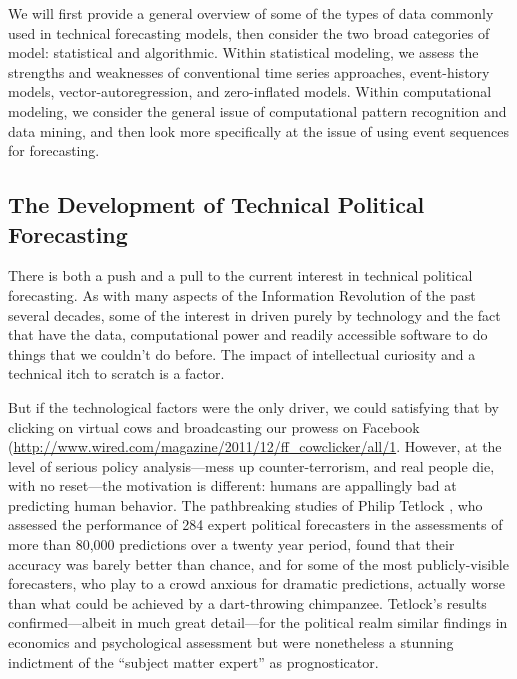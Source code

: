 \documentclass[graybox]{svmult}
\begin{document}
We will first provide a general overview of some of the types of data commonly used in technical forecasting models, then consider the two broad categories of model: statistical and algorithmic. {\color{blue}{[next sentences will be updated when manuscript is complete]}}Within statistical modeling, we assess the strengths and weaknesses of conventional time series approaches, event-history models, vector-autoregression, and zero-inflated models. Within computational modeling, we consider the general issue of computational pattern recognition and data mining, and then look more specifically at the issue of using event sequences for forecasting. 

\subsection{The Development of Technical Political Forecasting}
\label{subsec:TPF}

There is both a push and a pull to the current interest in technical political forecasting. As with many aspects of the Information Revolution of the past several decades, some of the interest in driven purely by technology and the fact that have the data, computational power and readily accessible software to do things that we couldn't do before. The impact of intellectual curiosity and a technical itch to scratch is a factor.

But if the technological factors were the only driver, we could satisfying that by clicking on virtual cows and broadcasting our prowess on Facebook (\url{http://www.wired.com/magazine/2011/12/ff\_cowclicker/all/1}. However, at the level of serious policy analysis---mess up counter-terrorism, and real people die, with no reset---the motivation is different: humans are appallingly bad at predicting human behavior. The pathbreaking studies of Philip Tetlock \cite{Tetlock05}, who assessed the performance of 284 expert political forecasters in the assessments of more than 80,000 predictions over a twenty year period, found that their accuracy was barely better than chance, and for some of the most publicly-visible forecasters, who play to a crowd anxious for dramatic predictions, actually worse than what could be achieved by a dart-throwing chimpanzee. Tetlock's results confirmed---albeit in much great detail---for the political realm similar findings in economics and psychological assessment \cite{Meehl54,Kahneman11} but were nonetheless a stunning indictment of the ``subject matter expert'' as prognosticator.  
\end{document}
